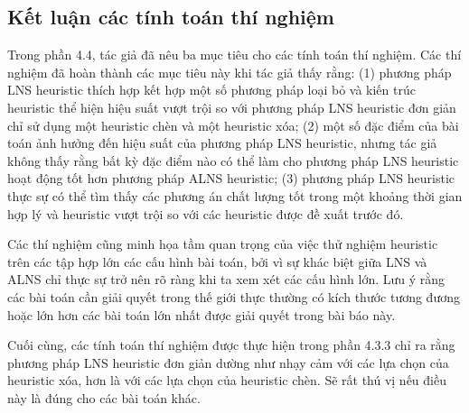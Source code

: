 \subsection{Kết luận các tính toán thí nghiệm}
Trong phần 4.4, tác giả đã nêu ba mục tiêu cho các tính toán thí nghiệm. Các thí nghiệm đã hoàn thành các mục tiêu này khi tác giả thấy rằng: (1) phương pháp LNS heuristic thích hợp kết hợp một số phương pháp loại bỏ và kiến trúc heuristic thể hiện hiệu suất vượt trội so với phương pháp LNS heuristic đơn giản chỉ sử dụng một heuristic chèn và một heuristic xóa; (2) một số đặc điểm của bài toán ảnh hưởng đến hiệu suất của phương pháp LNS heuristic, nhưng tác giả không thấy rằng bất kỳ đặc điểm nào có thể làm cho phương pháp LNS heuristic hoạt động tốt hơn phương pháp ALNS heuristic; (3) phương pháp LNS heuristic thực sự có thể tìm thấy các phương án chất lượng tốt trong một khoảng thời gian hợp lý và heuristic vượt trội so với các heuristic được đề xuất trước đó.

Các thí nghiệm cũng minh họa tầm quan trọng của việc thử nghiệm heuristic trên các tập hợp lớn các cấu hình bài toán, bởi vì sự khác biệt giữa LNS và ALNS chỉ thực sự trở nên rõ ràng khi ta xem xét các cấu hình lớn. Lưu ý rằng các bài toán cần giải quyết trong thế giới thực thường có kích thước tương đương hoặc lớn hơn các bài toán lớn nhất được giải quyết trong bài báo này.

Cuối cùng, các tính toán thí nghiệm được thực hiện trong phần 4.3.3 chỉ ra rằng phương pháp LNS heuristic đơn giản dường như nhạy cảm với các lựa chọn của heuristic xóa, hơn là với các lựa chọn của heuristic chèn. Sẽ rất thú vị nếu điều này là đúng cho các bài toán khác.


